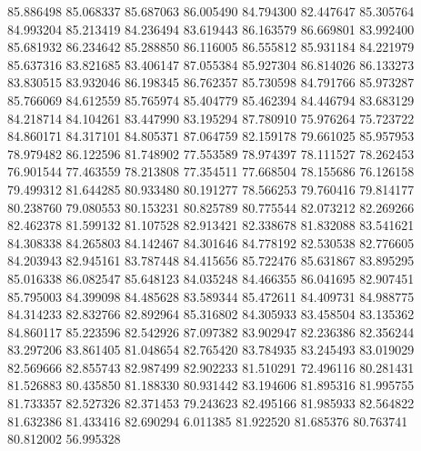 85.886498
85.068337
85.687063
86.005490
84.794300
82.447647
85.305764
84.993204
85.213419
84.236494
83.619443
86.163579
86.669801
83.992400
85.681932
86.234642
85.288850
86.116005
86.555812
85.931184
84.221979
85.637316
83.821685
83.406147
87.055384
85.927304
86.814026
86.133273
83.830515
83.932046
86.198345
86.762357
85.730598
84.791766
85.973287
85.766069
84.612559
85.765974
85.404779
85.462394
84.446794
83.683129
84.218714
84.104261
83.447990
83.195294
87.780910
75.976264
75.723722
84.860171
84.317101
84.805371
87.064759
82.159178
79.661025
85.957953
78.979482
86.122596
81.748902
77.553589
78.974397
78.111527
78.262453
76.901544
77.463559
78.213808
77.354511
77.668504
78.155686
76.126158
79.499312
81.644285
80.933480
80.191277
78.566253
79.760416
79.814177
80.238760
79.080553
80.153231
80.825789
80.775544
82.073212
82.269266
82.462378
81.599132
81.107528
82.913421
82.338678
81.832088
83.541621
84.308338
84.265803
84.142467
84.301646
84.778192
82.530538
82.776605
84.203943
82.945161
83.787448
84.415656
85.722476
85.631867
83.895295
85.016338
86.082547
85.648123
84.035248
84.466355
86.041695
82.907451
85.795003
84.399098
84.485628
83.589344
85.472611
84.409731
84.988775
84.314233
82.832766
82.892964
85.316802
84.305933
83.458504
83.135362
84.860117
85.223596
82.542926
87.097382
83.902947
82.236386
82.356244
83.297206
83.861405
81.048654
82.765420
83.784935
83.245493
83.019029
82.569666
82.855743
82.987499
82.902233
81.510291
72.496116
80.281431
81.526883
80.435850
81.188330
80.931442
83.194606
81.895316
81.995755
81.733357
82.527326
82.371453
79.243623
82.495166
81.985933
82.564822
81.632386
81.433416
82.690294
6.011385
81.922520
81.685376
80.763741
80.812002
56.995328
